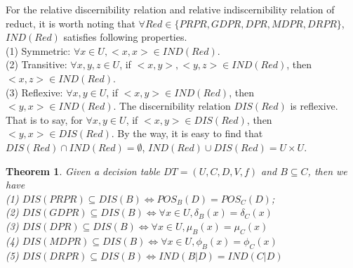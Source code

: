 \documentclass[review]{elsarticle}
\newtheorem{myTheo}{Theorem}
\begin{document}
		For the relative discernibility relation and relative indiscernibility relation of reduct, it is worth noting that $\forall Red \in \{PRPR, GDPR, DPR, MDPR, DRPR\}$, $IND(Red)$ satisfies following properties.
		\\{\rm(1)} Symmetric: $\forall x \in U, <x,x>\in IND(Red)$.
		\\{\rm(2)} Transitive: $\forall x,y,z \in U$, if $<x,y>,<y,z> \in IND(Red)$, then $<x,z> \in IND(Red)$.
		\\{\rm(3)} Reflexive: $\forall x,y \in U$, if $<x,y> \in IND(Red)$, then $<y,x> \in IND(Red)$.
		The discernibility relation $DIS(Red)$ is reflexive. That is to say, for $\forall x,y \in U$, if $<x,y> \in DIS(Red)$, then $<y,x> \in DIS(Red)$.
		By the way, it is easy to find that $DIS(Red) \cap IND(Red)=\emptyset$, $IND(Red) \cup DIS(Red) = U \times U$.
		\begin{myTheo}\label{redB}
			Given a decision table $DT=(U,C,D,V,f)$ and $B \subseteq C$, then we have\\
			{\rm(1)} $DIS(PRPR) \subseteq DIS(B) \Leftrightarrow POS_B(D)=POS_C(D)$;\\
			{\rm(2)} $DIS(GDPR) \subseteq DIS(B) \Leftrightarrow \forall x \in U, \delta_B(x)=\delta_C(x)$\\
			{\rm(3)} $DIS(DPR) \subseteq DIS(B) \Leftrightarrow \forall x \in U, \mu_B(x)=\mu_C(x)$\\
			{\rm(4)} $DIS(MDPR) \subseteq DIS(B) \Leftrightarrow \forall x \in U, \phi_B(x)=\phi_C(x)$\\
			{\rm(5)} $DIS(DRPR) \subseteq DIS(B) \Leftrightarrow IND(B|D)=IND(C|D)$\\
		\end{myTheo}
\end{document}
